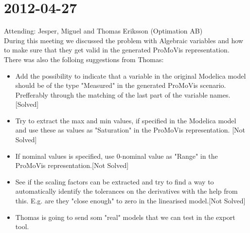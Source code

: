 \section{2012-04-27}
Attending: Jesper, Miguel and Thomas Eriksson (Optimation AB)\\\newline During this meeting we discussed the problem with Algebraic variables and how to make sure that they get valid in the generated ProMoVis representation. There was also the folloing suggestions from Thomas:
\begin{itemize}
\item Add the possibility to indicate that a variable in the original Modelica model should be of the type "Measured" in the generated ProMoVis scenario. Prefferably through the matching of the last part of the variable names.[Solved]
\item Try to extract the max and min values, if specified in the Modelica model and use these as values as "Saturation" in the ProMoVis representation. [Not Solved]
\item If nominal values is specified, use 0-nominal value as "Range" in the ProMoVis representation.[Not Solved]
\item See if the scaling factors can be extracted and try to find a way to automatically identify the tolerances on the derivatives with the help from this. E.g. are they "close enough" to zero in the linearised model.[Not Solved]
\item Thomas is going to send som "real" models that we can test in the export tool.
\end{itemize}